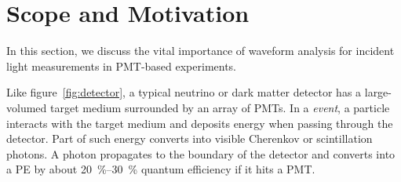\section{Scope and Motivation}
\label{sec:toyMC}

In this section, we discuss the vital importance of waveform analysis for incident light measurements in PMT-based experiments.

Like figure~\ref{fig:detector}, a typical neutrino or dark matter detector has a large-volumed target medium surrounded by an array of PMTs. In a \textit{event}, a particle interacts with the target medium and deposits energy when passing through the detector. Part of such energy converts into visible Cherenkov or scintillation photons. A photon propagates to the boundary of the detector and converts into a PE by about \SIrange{20}{30}{\percent} quantum efficiency if it hits a PMT.


